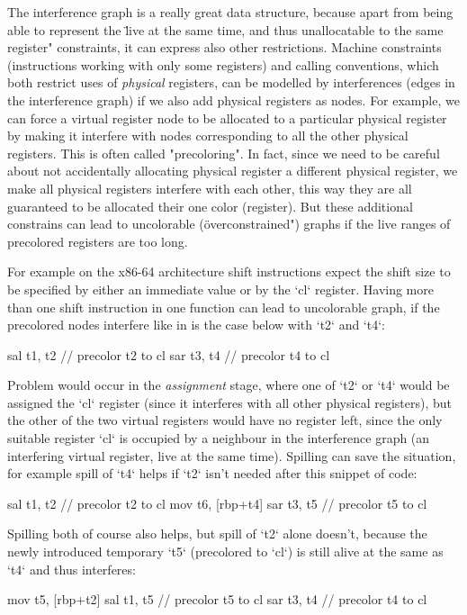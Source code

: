 The interference graph is a really great data structure, because apart from
being able to represent the \"live at the same time, and thus unallocatable to
the same register" constraints, it can express also other restrictions. Machine
constraints (instructions working with only some registers) and calling
conventions, which both restrict uses of {\em physical} registers, can be
modelled by interferences (edges in the interference graph) if we also add
physical registers as nodes. For example, we can force a virtual register node
to be allocated to a particular physical register by making it interfere with
nodes corresponding to all the other physical registers. This is often called
"precoloring". In fact, since we need to be careful about not accidentally
allocating physical register a different physical register, we make all physical
registers interfere with each other, this way they are all guaranteed to be
allocated their one color (register). But these additional constrains can lead
to uncolorable (\"overconstrained") graphs if the live ranges of precolored
registers are too long.

For example on the x86-64 architecture shift instructions expect the shift size
to be specified by either an immediate value or by the `cl` register. Having
more than one shift instruction in one function can lead to uncolorable graph,
if the precolored nodes interfere like in is the case below with `t2` and `t4`:

\begtt
sal t1, t2 // precolor t2 to cl
sar t3, t4 // precolor t4 to cl
\endtt

Problem would occur in the {\em assignment} stage, where one of `t2` or `t4`
would be assigned the `cl` register (since it interferes with all other physical
registers), but the other of the two virtual registers would have no register
left, since the only suitable register `cl` is occupied by a neighbour in the
interference graph (an interfering virtual register, live at the same time).
Spilling can save the situation, for example spill of `t4` helps if `t2` isn't
needed after this snippet of code:

\begtt
sal t1, t2 // precolor t2 to cl
mov t6, [rbp+t4]
sar t3, t5 // precolor t5 to cl
\endtt

Spilling both of course also helps, but spill of `t2` alone doesn't, because the
newly introduced temporary `t5` (precolored to `cl`) is still alive at the same
as `t4` and thus interferes:

\begtt
mov t5, [rbp+t2]
sal t1, t5 // precolor t5 to cl
sar t3, t4 // precolor t4 to cl
\endtt

